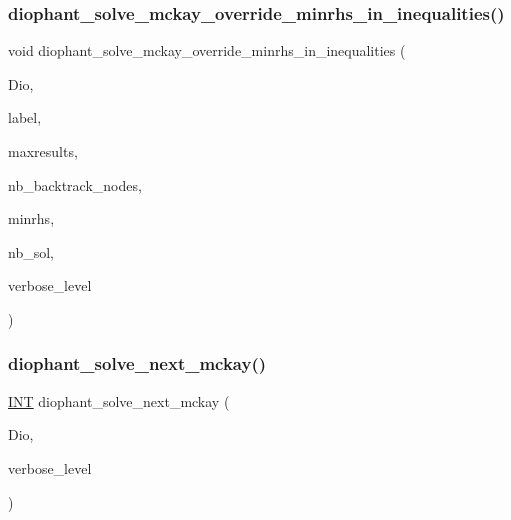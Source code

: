 \subsubsection{\texorpdfstring{diophant\+\_\+solve\+\_\+mckay\+\_\+override\+\_\+minrhs\+\_\+in\+\_\+inequalities()}{diophant\_solve\_mckay\_override\_minrhs\_in\_inequalities()}}
{\footnotesize\ttfamily void diophant\+\_\+solve\+\_\+mckay\+\_\+override\+\_\+minrhs\+\_\+in\+\_\+inequalities (\begin{DoxyParamCaption}\item[{\mbox{\hyperlink{classdiophant}{diophant}} $\ast$}]{Dio,  }\item[{const \mbox{\hyperlink{galois_8h_ab6cc7b4aeb6ea31aba2b3fbfc83ff5e6}{B\+Y\+TE}} $\ast$}]{label,  }\item[{\mbox{\hyperlink{galois_8h_a09fddde158a3a20bd2dcadb609de11dc}{I\+NT}}}]{maxresults,  }\item[{\mbox{\hyperlink{galois_8h_a09fddde158a3a20bd2dcadb609de11dc}{I\+NT}} \&}]{nb\+\_\+backtrack\+\_\+nodes,  }\item[{\mbox{\hyperlink{galois_8h_a09fddde158a3a20bd2dcadb609de11dc}{I\+NT}}}]{minrhs,  }\item[{\mbox{\hyperlink{galois_8h_a09fddde158a3a20bd2dcadb609de11dc}{I\+NT}} \&}]{nb\+\_\+sol,  }\item[{\mbox{\hyperlink{galois_8h_a09fddde158a3a20bd2dcadb609de11dc}{I\+NT}}}]{verbose\+\_\+level }\end{DoxyParamCaption})}

\mbox{\label{incidence__global_8_c_aeaf43346f76cbfe64ca21d3e8d9ed8fe}} 
\subsubsection{\texorpdfstring{diophant\+\_\+solve\+\_\+next\+\_\+mckay()}{diophant\_solve\_next\_mckay()}}
{\footnotesize\ttfamily \mbox{\hyperlink{galois_8h_a09fddde158a3a20bd2dcadb609de11dc}{I\+NT}} diophant\+\_\+solve\+\_\+next\+\_\+mckay (\begin{DoxyParamCaption}\item[{\mbox{\hyperlink{classdiophant}{diophant}} $\ast$}]{Dio,  }\item[{\mbox{\hyperlink{galois_8h_a09fddde158a3a20bd2dcadb609de11dc}{I\+NT}}}]{verbose\+\_\+level }\end{DoxyParamCaption})}

